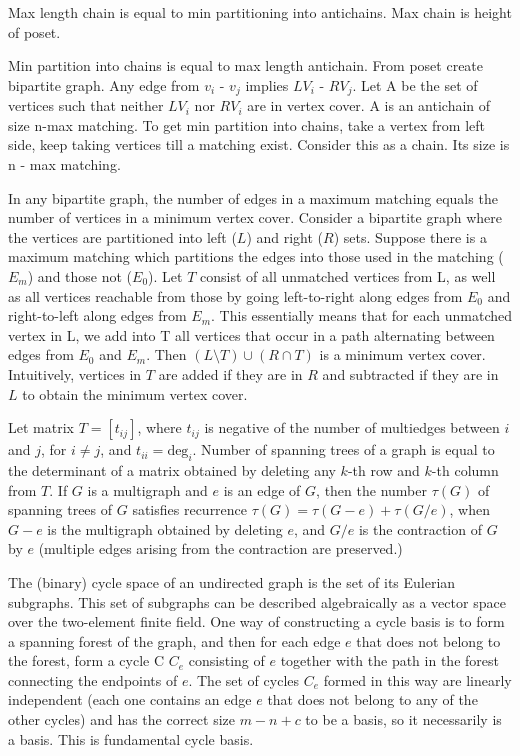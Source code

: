  Max length chain is equal to min partitioning into antichains. Max chain is height of poset.

 Min partition into chains is equal to max length antichain. From poset create bipartite graph. Any edge from $v_{i}$ - $v_{j}$ implies  $LV_{i}$ - $RV_{j}$. Let A be the set of vertices such that neither $LV_{i}$ nor $RV_{i}$ are in vertex cover. A is an antichain of size n-max matching. To get min partition into chains, take a vertex from left side, keep taking vertices till a matching exist. Consider this as a chain. Its size is n - max matching.

 In any bipartite graph, the number of edges in a maximum matching equals the number of vertices in a minimum vertex cover.
Consider a bipartite graph where the vertices are partitioned into left ($L$) and right ($R$) sets. Suppose there is a maximum matching which partitions the edges into those used in the matching ($E_m$) and those not ($E_0$). Let $T$ consist of all unmatched vertices from L, as well as all vertices reachable from those by going left-to-right along edges from $E_0$ and right-to-left along edges from $E_m$. This essentially means that for each unmatched vertex in L, we add into T all vertices that occur in a path alternating between edges from $E_0$ and $E_m$.
Then $(L \setminus T) \cup (R \cap T)$ is a minimum vertex cover. Intuitively, vertices in $T$ are added if they are in $R$ and subtracted if they are in $L$ to obtain the minimum vertex cover.

 Let matrix $T = [t_{ij}]$, where $t_{ij}$ is negative of the number of
multiedges between $i$ and $j$, for $i \ne j$, and $t_{ii} = \mbox{deg}_i$.
Number of spanning trees of a graph is equal to the determinant of
a matrix obtained by deleting any $k$-th row and $k$-th column from $T$.
If $G$ is a multigraph and $e$ is an edge of $G$, then the number $\tau(G)$ of
spanning trees of $G$ satisfies recurrence $\tau(G) = \tau(G-e) + \tau(G/e)$,
when $G-e$ is the multigraph obtained by deleting $e$, and $G/e$ is
the contraction of $G$ by $e$ (multiple edges arising from the contraction
are preserved.)

 The (binary) cycle space of an undirected graph is the set of its Eulerian subgraphs.
This set of subgraphs can be described algebraically as a vector space over the two-element finite field.
One way of constructing a cycle basis is to form a spanning forest of the graph, and then for each edge $e$ that does not belong to the forest, form a cycle C  $C_{e}$ consisting of $e$ together with the path in the forest connecting the endpoints of $e$. The set of cycles $C_{e}$ formed in this way are linearly independent (each one contains an edge $e$ that does not belong to any of the other cycles) and has the correct size $m − n + c$ to be a basis, so it necessarily is a basis. This is fundamental cycle basis.


